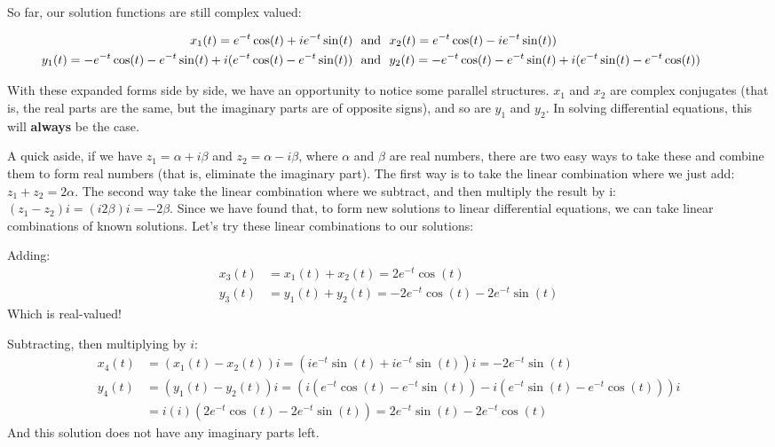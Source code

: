 So far, our solution functions are still complex valued:  

\begin{align*}
\hspace{-1cm}x_1(t) =  e^{-t}\cos(t) + i e^{-t}\sin(t) &\textrm{~~and~~} x_2(t) =  e^{-t}\cos(t) - i e^{-t}\sin(t))\\
\hspace{-1cm}y_1(t) = -e^{-t}\cos(t) - e^{-t}\sin(t) + i(e^{-t}\cos(t) - e^{-t}\sin(t)) & \textrm{~~and~~} y_2(t) = -e^{-t}\cos(t) - e^{-t}\sin(t) + i(e^{-t}\sin(t) - e^{-t}\cos(t))
\end{align*}

With these expanded forms side by side, we have an opportunity to notice some parallel structures.  $x_1$ and $x_2$ are complex conjugates (that is, the real parts are the same, but the imaginary parts are of opposite signs), and so are $y_1$ and $y_2$.  In solving differential equations, this will \textbf{always} be the case.  

A quick aside, if we have $z_1 = \alpha + i \beta $ and $z_2 = \alpha - i \beta$, where $\alpha$ and $\beta$ are real numbers, there are two easy ways to take these and combine them to form real numbers (that is, eliminate the imaginary part).  The first way is to take the linear combination where we just add: $z_1 + z_2 = 2\alpha$.  The second way take the linear combination where we subtract, and then multiply the result by i: $(z_1 - z_2)i = (i 2\beta)i  = -2\beta$.  Since we have found that, to form new solutions to linear differential equations, we can take linear combinations of known solutions.  Let's try these linear combinations to our solutions:

Adding: 
\begin{align*}
x_3 (t) &= x_1(t) + x_2(t) = 2e^{-t}\cos(t)\\
y_3 (t) &= y_1(t) + y_2(t) = -2e^{-t}\cos(t) -2e^{-t}\sin(t)
\end{align*}
Which is real-valued!  

Subtracting, then multiplying by $i$:
\begin{align*}
x_4(t) &= (x_1(t) - x_2(t))i = (ie^{-t}\sin(t) + i e^{-t}\sin(t)) i = -2e^{-t}\sin(t)\\
y_4(t) &= (y_1(t) - y_2(t))i = (i(e^{-t}\cos(t) - e^{-t}\sin(t))-i(e^{-t}\sin(t) - e^{-t}\cos(t)))i \\&= i(i)(2e^{-t}\cos(t) -2e^{-t}\sin(t)) = 2e^{-t}\sin(t) - 2e^{-t}\cos(t)
\end{align*}
And this solution does not have any imaginary parts left.

